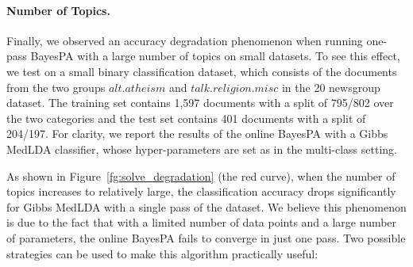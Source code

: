 \documentclass[twoside,11pt]{article}
\begin{document}
\paragraph{Number of Topics.} Finally, we observed an accuracy degradation phenomenon when running one-pass BayesPA with a large number of topics on small datasets. To see this effect, we test on a small binary classification dataset, which consists of the documents from the two groups $alt.atheism$ and $talk.religion.misc$ in the 20 newsgroup dataset. The training set contains 1,597 documents with a split of 795/802 over the two categories and the test set contains 401 documents with a split of 204/197. For clarity, we report the results of the online BayesPA with a Gibbs MedLDA classifier, whose hyper-parameters are set as in the multi-class setting.

As shown in Figure~\ref{fg:solve_degradation} (the red curve), when the number of topics increases to relatively large, the classification accuracy drops significantly for Gibbs MedLDA with a single pass of the dataset.
We believe this phenomenon is due to the fact that with a limited number of data points and a large number of parameters, the online BayesPA fails to converge in just one pass. Two possible strategies can be used to make this algorithm practically useful:

\end{document}
